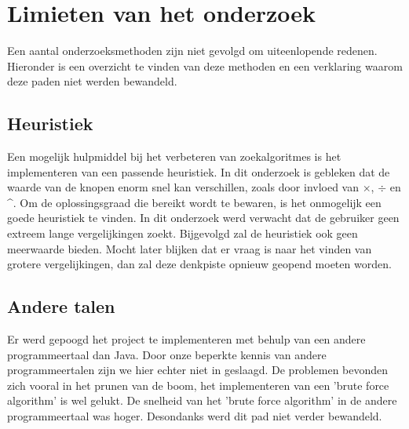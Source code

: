 \documentclass[Main.tex]{subfiles}
\begin{document}
\section{Limieten van het onderzoek}
Een aantal onderzoeksmethoden zijn niet gevolgd om uiteenlopende redenen. Hieronder is een overzicht te vinden van deze methoden en een verklaring waarom deze paden niet werden bewandeld. 

\subsection{Heuristiek}
Een mogelijk hulpmiddel bij het verbeteren van zoekalgoritmes is het implementeren van een passende heuristiek. In dit onderzoek is gebleken dat de waarde van de knopen enorm snel kan verschillen, zoals door invloed van $\times$, $\div$ en \^{}. Om de oplossingsgraad die bereikt wordt te bewaren, is het onmogelijk een goede heuristiek te vinden. In dit onderzoek werd verwacht dat de gebruiker geen extreem lange vergelijkingen zoekt. Bijgevolgd zal de heuristiek ook geen meerwaarde bieden. Mocht later blijken dat er vraag is naar het vinden van grotere vergelijkingen, dan zal deze denkpiste opnieuw geopend moeten worden.

\subsection{Andere talen}
Er werd gepoogd het project te implementeren met behulp van een andere programmeertaal dan Java. Door onze beperkte kennis van andere programmeertalen zijn we hier echter niet in geslaagd. De problemen bevonden zich vooral in het prunen van de boom, het implementeren van een 'brute force algorithm' is wel gelukt. De snelheid van het 'brute force algorithm' in de andere programmeertaal was hoger. Desondanks werd dit pad niet verder bewandeld.

\end{document}
